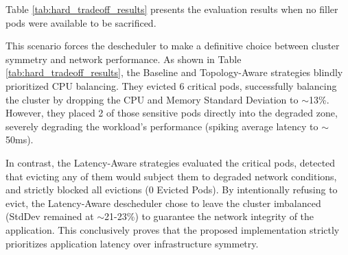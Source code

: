 Table \ref{tab:hard_tradeoff_results} presents the evaluation results when no filler pods were available to be sacrificed.
\begin{table}[H]
    \centering
    \caption{Descheduler Performance: The "Hard Tradeoff" Scenario (No Filler Pods)}
    \label{tab:hard_tradeoff_results}
\end{table}

This scenario forces the descheduler to make a definitive choice between cluster symmetry and network performance. As shown in Table \ref{tab:hard_tradeoff_results}, the Baseline and Topology-Aware strategies blindly prioritized CPU balancing. They evicted 6 critical pods, successfully balancing the cluster by dropping the CPU and Memory Standard Deviation to $\sim$13\%. However, they placed 2 of those sensitive pods directly into the degraded zone, severely degrading the workload's performance (spiking average latency to $\sim$50ms).

In contrast, the Latency-Aware strategies evaluated the critical pods, detected that evicting any of them would subject them to degraded network conditions, and strictly blocked all evictions (0 Evicted Pods). By intentionally refusing to evict, the Latency-Aware descheduler chose to leave the cluster imbalanced (StdDev remained at $\sim$21-23\%) to guarantee the network integrity of the application. This conclusively proves that the proposed implementation strictly prioritizes application latency over infrastructure symmetry.

